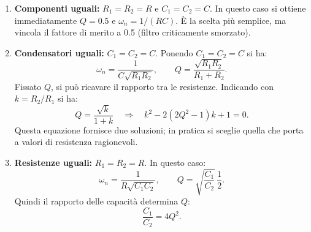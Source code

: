 \begin{enumerate}
\item \textbf{Componenti uguali:} \(R_1 = R_2 = R\) e \(C_1 = C_2 = C\).  
In questo caso si ottiene immediatamente \(Q = 0.5\) e \(\omega_n = 1/(RC)\). È la scelta più semplice, ma vincola il fattore di merito a 0.5 (filtro criticamente smorzato).

\item \textbf{Condensatori uguali:} \(C_1 = C_2 = C\).  
Ponendo \(C_1 = C_2 = C\) si ha:
\begin{equation}
\omega_n = \frac{1}{C\sqrt{R_1R_2}}, \qquad 
Q = \frac{\sqrt{R_1R_2}}{R_1+R_2}. \label{eq: wnQ_Cequal LP}
\end{equation}
Fissato \(Q\), si può ricavare il rapporto tra le resistenze. Indicando con \(k = R_2/R_1\) si ha:
\begin{equation}
Q = \frac{\sqrt{k}}{1+k} \quad\Rightarrow\quad k^2 - 2\left(2Q^2-1\right)k + 1 = 0. \label{LP:Q_k}
\end{equation}
Questa equazione fornisce due soluzioni; in pratica si sceglie quella che porta a valori di resistenza ragionevoli.

\item \textbf{Resistenze uguali:} \(R_1 = R_2 = R\).  
In questo caso:
\begin{equation}
\omega_n = \frac{1}{R\sqrt{C_1C_2}}, \qquad 
Q = \sqrt{\frac{C_1}{C_2}}\,\frac{1}{2}. \label{eq:wnQ_Requal LP}
\end{equation}
Quindi il rapporto delle capacità determina \(Q\):
\begin{equation}
\frac{C_1}{C_2} = 4Q^2. \label{eq:C_ratio LP}
\end{equation}


\end{enumerate}
